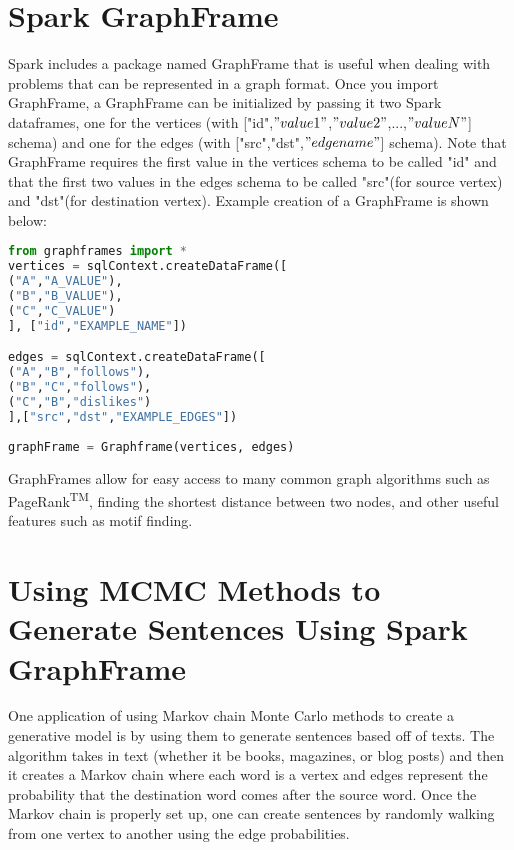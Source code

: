 \documentclass[9pt,twocolumn,twoside]{idsi}
\begin{document}
\section{Spark GraphFrame}
Spark includes a package named GraphFrame that is useful when dealing with problems that can be represented in a graph format. Once you import GraphFrame, a GraphFrame can be initialized by passing it two Spark dataframes, one for the vertices (with ["id",$"value1"$,$"value2"$,...,$"valueN"$] schema) and one for the edges (with ["src","dst",$"edge name"$] schema). Note that GraphFrame requires the first value in the vertices schema to be called "id" and that the first two values in the edges schema to be called "src"(for source vertex) and "dst"(for destination vertex). Example creation of a GraphFrame is shown below:

\begin{lstlisting}[language=python]
from graphframes import *
vertices = sqlContext.createDataFrame([
("A","A_VALUE"),
("B","B_VALUE"),
("C","C_VALUE")
], ["id","EXAMPLE_NAME"])

edges = sqlContext.createDataFrame([
("A","B","follows"),
("B","C","follows"),
("C","B","dislikes")
],["src","dst","EXAMPLE_EDGES"])
	
graphFrame = Graphframe(vertices, edges)
\end{lstlisting}

GraphFrames allow for easy access to many common graph algorithms such as PageRank\textsuperscript{TM}, 
finding the shortest distance between two nodes, and other useful features such as motif finding.\cite{Hunter:2}

\section{Using MCMC Methods to Generate Sentences Using Spark GraphFrame}

One application of using Markov chain Monte Carlo methods to create a generative model is by using them to generate sentences based off of texts. The algorithm takes in text (whether it be books, magazines, or blog posts) and then it creates a Markov chain where each word is a vertex and edges represent the probability that the destination word comes after the source word.
Once the Markov chain is properly set up, one can create sentences by randomly walking from one vertex to another using the edge probabilities.
\end{document}
